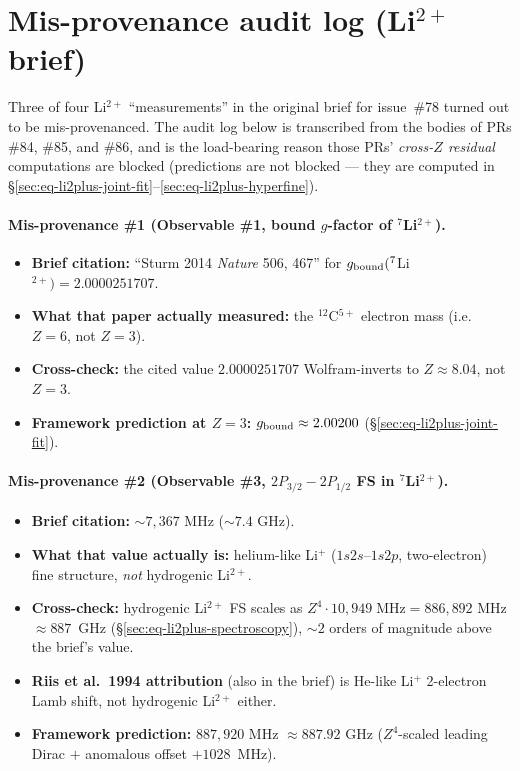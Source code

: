 \section{Mis-provenance audit log (Li$^{2+}$ brief)}
\label{sec:mis-provenance-audit}

Three of four Li$^{2+}$ ``measurements'' in the original brief for
issue~\#78 turned out to be mis-provenanced. The audit log below is
transcribed from the bodies of PRs \#84, \#85, and \#86, and is the
load-bearing reason those PRs' \emph{cross-$Z$ residual} computations
are blocked (predictions are not blocked --- they are computed in
\S\ref{sec:eq-li2plus-joint-fit}--\ref{sec:eq-li2plus-hyperfine}).

\paragraph{Mis-provenance \#1 (Observable \#1, bound $g$-factor of $^7$Li$^{2+}$).}
\begin{itemize}[topsep=2pt,itemsep=0pt]
  \item \textbf{Brief citation:} ``Sturm 2014 \emph{Nature} 506, 467''
        for $g_{\rm bound}(^7$Li$^{2+}) = 2.0000251707$.
  \item \textbf{What that paper actually measured:} the
        $^{12}$C$^{5+}$ electron mass (i.e.~$Z = 6$, not $Z = 3$).
  \item \textbf{Cross-check:} the cited value $2.0000251707$ Wolfram-inverts
        to $Z \approx 8.04$, not $Z = 3$.
  \item \textbf{Framework prediction at $Z = 3$:} $g_{\rm bound} \approx
        2.00200$ (\S\ref{sec:eq-li2plus-joint-fit}).
\end{itemize}

\paragraph{Mis-provenance \#2 (Observable \#3, $2P_{3/2}{-}2P_{1/2}$ FS in $^7$Li$^{2+}$).}
\begin{itemize}[topsep=2pt,itemsep=0pt]
  \item \textbf{Brief citation:} $\sim 7{,}367$ MHz ($\sim 7.4$ GHz).
  \item \textbf{What that value actually is:} helium-like Li$^+$ ($1s2s$--$1s2p$,
        two-electron) fine structure, \emph{not} hydrogenic Li$^{2+}$.
  \item \textbf{Cross-check:} hydrogenic Li$^{2+}$ FS scales as
        $Z^4 \cdot 10{,}949\;\text{MHz} = 886{,}892$ MHz $\approx 887$~GHz
        (\S\ref{sec:eq-li2plus-spectroscopy}), $\sim 2$ orders of magnitude
        above the brief's value.
  \item \textbf{Riis et al.~1994 attribution} (also in the brief) is
        He-like Li$^+$ 2-electron Lamb shift, not hydrogenic Li$^{2+}$ either.
  \item \textbf{Framework prediction:} $887{,}920$ MHz $\approx 887.92$ GHz
        ($Z^4$-scaled leading Dirac $+$ anomalous offset $+1028$~MHz).
\end{itemize}


